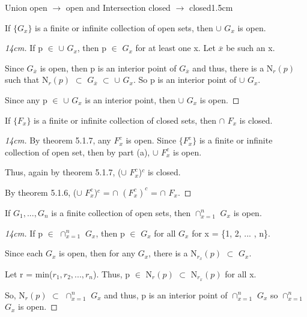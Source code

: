 	\begin{ltheorem}{Union open $\rightarrow$ open and
	Intersection closed $\rightarrow$ closed}{1.5cm}
		\item If $\{G_x\}$ is a finite or infinite collection of open sets,
		then $\cup$ $G_x$ is open.

			\begin{proof}[14cm]
				If p $\in$ $\cup$ $G_x$, then p $\in$ $G_x$ for at least one x.
				Let $\overline{x}$ be such an x.

				Since $G_{\overline{x}}$ is open, then p is an interior point of
				$G_{\overline{x}}$ and thus, there is a N$_r(p)$ such that
				N$_r(p)$ $\subset$ $G_{\overline{x}}$ $\subset$ $\cup$ $G_x$.
				So p is an interior point of $\cup$ $G_x$.

				Since any p $\in$ $\cup$ $G_x$ is an interior point, then
				$\cup$ $G_x$ is open.
			\end{proof}

		\item If $\{F_x\}$ is a finite or infinite collection of closed sets,
		then $\cap$ $F_x$ is closed.

			\begin{proof}[14cm]
				By {\color{red} theorem 5.1.7}, any $F_x^c$ is open.
				Since $\{F_x^c\}$ is a finite or infinite collection of
				open set, then by part (a), $\cup$ $F_x^c$ is open.

				Thus, again by {\color{red} theorem 5.1.7},
				($\cup$ $F_x^c$)$^c$ is closed.

				By {\color{red} theorem 5.1.6},
				($\cup$ $F_x^c$)$^c$ = $\cap$ $(F_x^c)^c$
				= $\cap$ $F_x$.
			\end{proof}

		\item If $G_1, ... , G_n$ is a finite collection of open sets,
		then $\cap_{x=1}^n$ $G_x$ is open.

			\begin{proof}[14cm]
				If p $\in$ $\cap_{x=1}^n$ $G_x$, then p $\in$ $G_x$ for
				all $G_x$ for x = \{1, 2, ... , n\}.

				Since each $G_x$ is open, then for any $G_x$, there is a
				N$_{r_x}(p)$ $\subset$ $G_x$.

				Let r = min($r_1, r_2 , ... , r_n$).
				Thus, p $\in$ N$_r(p)$ $\subset$ N$_{r_x}(p)$ for all x.

				So, N$_r(p)$ $\subset$ $\cap_{x=1}^n$ $G_x$ and thus,
				p is an interior point of $\cap_{x=1}^n$ $G_x$ so
				$\cap_{x=1}^n$ $G_x$ is open.


\end{proof}
\end{ltheorem}
